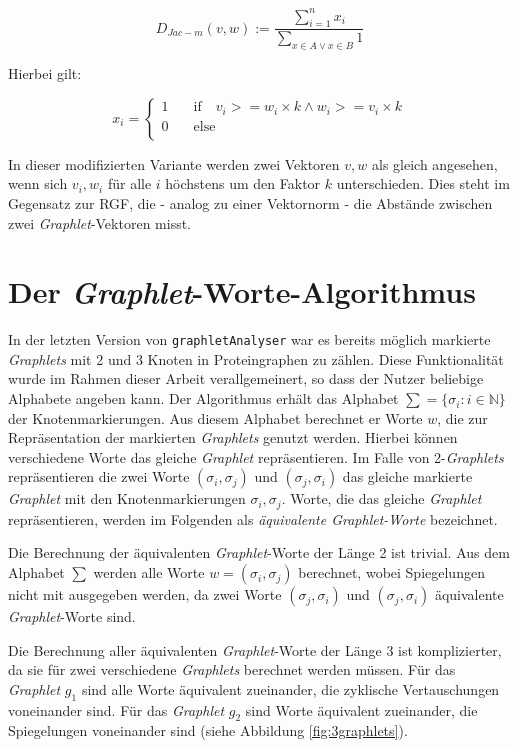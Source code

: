 \documentclass{report}
\begin{document}
\[ D_{Jac-m}(v,w) := \frac{\sum_{i = 1}^n x_i}{\sum_{x \in A \lor x \in B} 1} \]

Hierbei gilt:

\[ x_i = 
   \begin{cases}
     1     & \quad \mathrm{if} \quad v_i >= w_i \times k \land w_i >= v_i \times k \\
     0     & \quad \mathrm{else} \\
   \end{cases}
\]

In dieser modifizierten Variante werden zwei Vektoren $v,w$ als gleich angesehen, wenn sich $v_i,w_i$ f\"ur alle $i$ h\"ochstens um den Faktor $k$ unterschieden.
Dies steht im Gegensatz zur RGF, die - analog zu einer Vektornorm - die Abst\"ande zwischen zwei \textit{Graphlet}-Vektoren misst.


\section{Der \textit{Graphlet}-Worte-Algorithmus}

In der letzten Version von \texttt{graphletAnalyser} war es bereits m\"oglich markierte \textit{Graphlets} mit 2 und 3 Knoten in Proteingraphen zu z\"ahlen. Diese Funktionalit\"at wurde im Rahmen dieser Arbeit verallgemeinert, so dass der Nutzer beliebige Alphabete angeben kann.
Der Algorithmus erh\"alt das Alphabet $\sum = \{ \sigma_i : i \in \mathbb{N} \}$ der Knotenmarkierungen. Aus diesem Alphabet berechnet er Worte $w$, die zur Repr\"asentation der markierten \textit{Graphlets} genutzt werden.
Hierbei k\"onnen verschiedene Worte das gleiche \textit{Graphlet} repr\"asentieren. Im Falle von 2-\textit{Graphlets} repr\"asentieren die zwei Worte $(\sigma_i,\sigma_j)$ und $(\sigma_j, \sigma_i)$ das gleiche markierte \textit{Graphlet} mit den Knotenmarkierungen $\sigma_i,\sigma_j$. Worte, die das gleiche \textit{Graphlet} repr\"asentieren, werden im Folgenden als \emph{\"aquivalente Graphlet-Worte}  bezeichnet.


Die Berechnung der \"aquivalenten \textit{Graphlet}-Worte der L\"ange 2 ist trivial. Aus dem Alphabet $\sum$ werden alle Worte $w = (\sigma_i, \sigma_j)$ berechnet, wobei Spiegelungen nicht mit ausgegeben werden, da zwei Worte $ (\sigma_j, \sigma_i) $ und $ (\sigma_j, \sigma_i) $ \"aquivalente \textit{Graphlet}-Worte sind.

Die Berechnung aller \"aquivalenten \textit{Graphlet}-Worte der L\"ange 3 ist komplizierter, da sie f\"ur zwei verschiedene \textit{Graphlets} berechnet werden m\"ussen. F\"ur das \textit{Graphlet} $g_1$ sind alle Worte \"aquivalent zueinander, die zyklische Vertauschungen voneinander sind. F\"ur das \textit{Graphlet} $g_2$ sind Worte \"aquivalent zueinander, die Spiegelungen voneinander sind (siehe Abbildung \ref{fig:3graphlets}). \\
\end{document}
